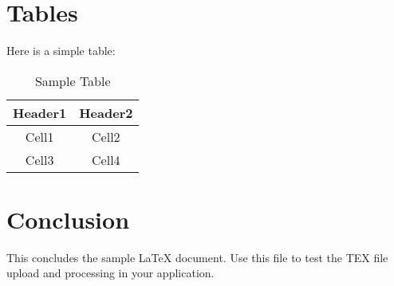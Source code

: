 \documentclass{article}
\begin{document}
\section{Tables}

Here is a simple table:

\begin{table}[h]
\centering
\begin{tabular}{|c|c|}
\hline
Header1 & Header2 \\
\hline
Cell1 & Cell2 \\
\hline
Cell3 & Cell4 \\
\hline
\end{tabular}
\caption{Sample Table}
\end{table}

\section{Conclusion}

This concludes the sample LaTeX document. Use this file to test the TEX file upload and processing in your application.
\end{document}
